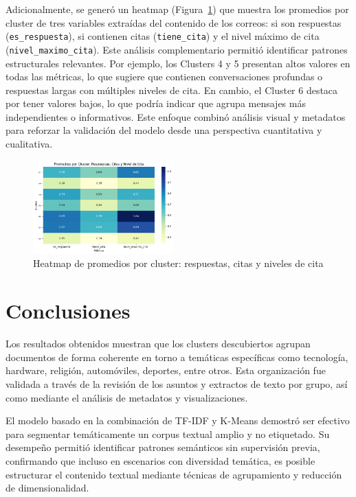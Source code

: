 \documentclass[journal]{IEEEtran}
\begin{document}
Adicionalmente, se generó un heatmap (Figura~\ref{fig:heatmap}) que muestra los promedios por cluster de tres variables extraídas del contenido de los correos: si son respuestas (\texttt{es\_respuesta}), si contienen citas (\texttt{tiene\_cita}) y el nivel máximo de cita (\texttt{nivel\_maximo\_cita}). Este análisis complementario permitió identificar patrones estructurales relevantes. Por ejemplo, los Clusters 4 y 5 presentan altos valores en todas las métricas, lo que sugiere que contienen conversaciones profundas o respuestas largas con múltiples niveles de cita. En cambio, el Cluster 6 destaca por tener valores bajos, lo que podría indicar que agrupa mensajes más independientes o informativos. Este enfoque combinó análisis visual y metadatos para reforzar la validación del modelo desde una perspectiva cuantitativa y cualitativa.

\begin{figure}[H]
    \centering
    \includegraphics[width=0.48\textwidth]{fig5.png}
    \caption{Heatmap de promedios por cluster: respuestas, citas y niveles de cita}
    \label{fig:heatmap}
\end{figure}

\section*{Conclusiones}

Los resultados obtenidos muestran que los clusters descubiertos agrupan documentos de forma coherente en torno a temáticas específicas como tecnología, hardware, religión, automóviles, deportes, entre otros. Esta organización fue validada a través de la revisión de los asuntos y extractos de texto por grupo, así como mediante el análisis de metadatos y visualizaciones.

\vspace{12pt}
El modelo basado en la combinación de TF-IDF y K-Means demostró ser efectivo para segmentar temáticamente un corpus textual amplio y no etiquetado. Su desempeño permitió identificar patrones semánticos sin supervisión previa, confirmando que incluso en escenarios con diversidad temática, es posible estructurar el contenido textual mediante técnicas de agrupamiento y reducción de dimensionalidad.
\end{document}
